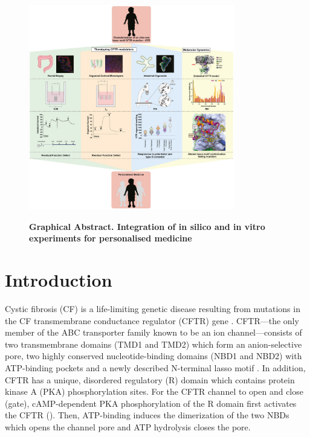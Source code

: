\begin{figure} [h]
	\begin{center}
		\includegraphics[width=0.80\textwidth]{figures/I37R/graphical_abstract.jpg}
	\end{center}
	\captionsetup{singlelinecheck = false, justification=raggedright}
	\caption[Graphical Abstract. Integration of in silico and in vitro experiments for personalised medicine] {\textbf{Graphical Abstract. Integration of in silico and in vitro experiments for personalised medicine}}{}
	\label{i37r_graphical_abstract}
\end{figure}

\section{Introduction}
Cystic fibrosis (CF) is a life-limiting genetic disease resulting from mutations in the CF transmembrane conductance regulator (CFTR) gene \cite{ratjen2015}. CFTR—the only member of the ABC transporter family known to be an ion channel—consists of two transmembrane domains (TMD1 and TMD2) which form an anion-selective pore, two highly conserved nucleotide-binding domains (NBD1 and NBD2) with ATP-binding pockets and a newly described N-terminal lasso motif \cite{hwang2013, zhang2016}. In addition, CFTR has a unique, disordered regulatory (R) domain which contains protein kinase A (PKA) phosphorylation sites. For the CFTR channel to open and close (gate), cAMP-dependent PKA phosphorylation of the R domain first activates the CFTR (\cite{gadsby1994}). Then, ATP-binding induces the dimerization of the two NBDs which opens the channel pore and ATP hydrolysis closes the pore.

